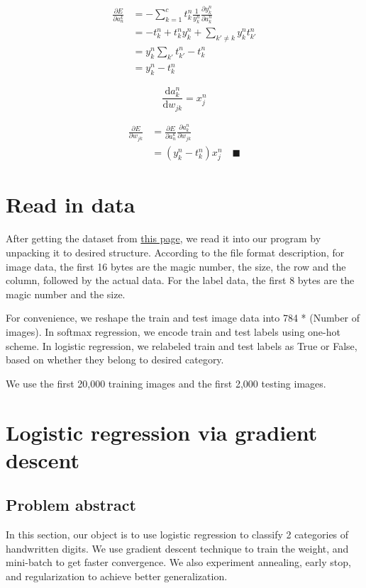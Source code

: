 \documentclass{article}
\begin{document}
\begin{equation*}
\begin{split}
	\frac{\partial E}{\partial a_n^k} &= - \sum_{k=1}^{c} t_k^n \frac{1}{y_k^n} \frac{\partial y_k^n}{\partial a_k^n}  \\
	&= -t_k^n + t_k^n y_k^n + \sum_{k' \ne k} y_k^n t_{k'}^n\\
	&= y_k^n \sum_{k'}t_{k'}^n - t_k^n \\
	&= y_k^n - t_k^n
\end{split}
\end{equation*}

\begin{equation*}
	\dfrac{\mathrm{d} a_k^n}{\mathrm{d} w_{jk}} = x_j^n
\end{equation*}

\begin{equation*}
\begin{split}
	\frac{\partial E}{\partial w_{jk}} &= \frac{\partial E}{\partial a_n^k} \frac{\partial a_k^n}{\partial w_{jk}} \\
	&= (y_k^n - t_k^n) x_j^n \quad\blacksquare
\end{split}
\end{equation*}

\section{Read in data}
After getting the dataset from \href{http://yann.lecun.com/exdb/mnist/}{this page}, we read it into our program by unpacking it to desired structure. According to the file format description, for image data, the first 16 bytes are the magic number, the size, the row and the column, followed by the actual data. For the label data, the first 8 bytes are the magic number and the size.

For convenience, we reshape the train and test image data into 784 * (Number of images). In softmax regression, we encode train and test labels using one-hot scheme. In logistic regression, we relabeled train and test labels as True or False, based on whether they belong to desired category.

We use the first 20,000 training images and the first 2,000 testing images.

\newpage
\section{Logistic regression via gradient descent}
\subsection{Problem abstract}
In this section, our object is to use logistic regression to classify 2 categories of handwritten digits. We use gradient descent technique to train the weight, and mini-batch to get faster convergence. We also experiment annealing, early stop, and regularization to achieve better generalization.
\end{document}
